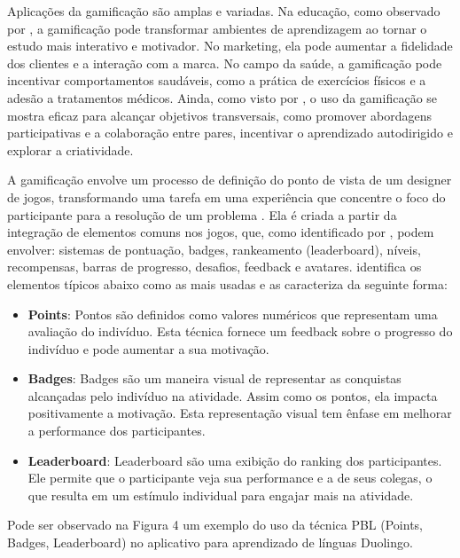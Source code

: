 \documentclass[
	12pt,
	openright,
	twoside,
	a4paper,
	english,
	brazil
	]{abntex2}
\begin{document}
Aplicações da gamificação são amplas e variadas. Na educação, como observado por , a gamificação pode transformar ambientes de aprendizagem ao tornar o estudo mais interativo e motivador. No marketing, ela pode aumentar a fidelidade dos clientes e a interação com a marca. No campo da saúde, a gamificação pode incentivar comportamentos saudáveis, como a prática de exercícios físicos e a adesão a tratamentos médicos. Ainda, como visto por , o uso da gamificação se mostra eficaz para alcançar objetivos transversais, como promover abordagens participativas e a colaboração entre pares, incentivar o aprendizado autodirigido e explorar a criatividade.

A gamificação envolve um processo de definição do ponto de vista de um designer de jogos, transformando uma tarefa em uma experiência que concentre o foco do participante para a resolução de um problema \cite{Fardo_2013}. Ela é criada a partir da integração de elementos comuns nos jogos, que, como identificado por , podem envolver: sistemas de pontuação, badges, rankeamento (leaderboard), níveis, recompensas, barras de progresso, desafios, feedback e avatares.  identifica os elementos típicos abaixo como as mais usadas e as caracteriza da seguinte forma:
\begin{itemize}
  \item \textbf{Points}: Pontos são definidos como valores numéricos que representam uma avaliação do indivíduo. Esta técnica fornece um feedback sobre o progresso do indivíduo e pode aumentar a sua motivação.

  \item \textbf{Badges}: Badges são um maneira visual de representar as conquistas alcançadas pelo indivíduo na atividade. Assim como os pontos, ela impacta positivamente a motivação. Esta representação visual tem ênfase em melhorar a performance dos participantes.

  \item \textbf{Leaderboard}: Leaderboard são uma exibição do ranking dos participantes. Ele permite que o participante veja sua performance e a de seus colegas, o que resulta em um estímulo individual para engajar mais na atividade.
\end{itemize}

Pode ser observado na Figura 4 um exemplo do uso da técnica PBL (Points, Badges, Leaderboard) no aplicativo para aprendizado de línguas Duolingo.
\end{document}
